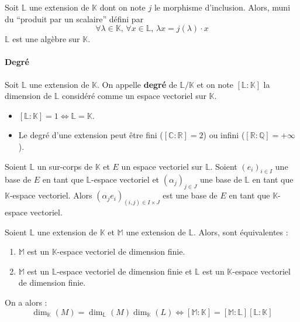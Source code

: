   \begin{proposition}
    Soit $\mathbb{L}$ une extension de $\mathbb{K}$ dont on note $j$ le morphisme d'inclusion. Alors, muni du ``produit par un scalaire'' défini par
    \[ \forall \lambda \in \mathbb{K}, \, \forall x \in \mathbb{L}, \, \lambda x = j(\lambda) \cdot x \]
    $\mathbb{L}$ est une algèbre sur $\mathbb{K}$.
  \end{proposition}

  \paragraph{Degré}

  \begin{definition}
    Soit $\mathbb{L}$ une extension de $\mathbb{K}$. On appelle \textbf{degré} de $\mathbb{L}/\mathbb{K}$ et on note $[\mathbb{L}:\mathbb{K}]$ la dimension de $\mathbb{L}$ considéré comme un espace vectoriel sur $\mathbb{K}$.
  \end{definition}

  \begin{remark}
    \begin{itemize}
      \item $[\mathbb{L}:\mathbb{K}] = 1 \iff \mathbb{L} = \mathbb{K}$.
      \item Le degré d'une extension peut être fini ($[\mathbb{C}:\mathbb{R}] = 2$) ou infini ($[\mathbb{R}:\mathbb{Q}] = +\infty$).
    \end{itemize}
  \end{remark}

  \begin{theorem}
    Soient $\mathbb{L}$ un sur-corps de $\mathbb{K}$ et $E$ un espace vectoriel sur $\mathbb{L}$.
    Soient $(e_i)_{i \in I}$ une base de $E$ en tant que $\mathbb{L}$-espace vectoriel et $(\alpha_j)_{j \in J}$ une base de $\mathbb{L}$ en tant que $\mathbb{K}$-espace vectoriel.
    \newpar
    Alors $(\alpha_j e_i)_{(i,j) \in I \times J}$ est une base de $E$ en tant que $\mathbb{K}$-espace vectoriel.
  \end{theorem}

  \begin{corollary}
    Soient $\mathbb{L}$ une extension de $\mathbb{K}$ et $\mathbb{M}$ une extension de $\mathbb{L}$. Alors, sont équivalentes :
    \begin{enumerate}[label=(\roman*)]
      \item $\mathbb{M}$ est un $\mathbb{K}$-espace vectoriel de dimension finie.
      \item $\mathbb{M}$ est un $\mathbb{L}$-espace vectoriel de dimension finie et $\mathbb{L}$ est un $\mathbb{K}$-espace vectoriel de dimension finie.
    \end{enumerate}
    On a alors :
    \[ \dim_{\mathbb{K}}(M) = \dim_{\mathbb{L}}(M) \dim_{\mathbb{K}}(L) \iff [\mathbb{M}:\mathbb{K}] = [\mathbb{M}:\mathbb{L}] [\mathbb{L}:\mathbb{K}] \]
  \end{corollary}

